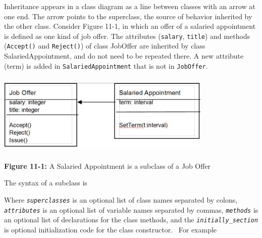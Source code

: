 Inheritance appears in a class diagram as a line between classes with an
arrow at one end. The arrow points to the superclass, the source of
behavior inherited by the other class. Consider Figure 11-1, in which
an offer of a salaried appointment is defined as one kind of job offer.
The attributes (\texttt{salary}, \texttt{title}) and methods
(\texttt{Accept()} and \texttt{Reject()}) of class JobOffer are
inherited by class SalariedAppointment, and do not need to be repeated
there. A new attribute (term) is added in \texttt{SalariedAppointment}
that is not in \texttt{JobOffer}.

\begin{center}
\includegraphics[width=4.05in,height=1.52in]{ub-img/subclass.png} 

{\sffamily\bfseries Figure 11-1:}
{\sffamily A Salaried Appointment is a subclass of a Job Offer}
\end{center}

\noindent
The syntax of a subclass is 


Where \texttt{\textit{superclasses}} is an optional list of class names
separated by colons, \texttt{\textit{attributes}} is an optional list
of variable names separated by commas,
\texttt{\textit{methods}} is an optional list of declarations for the
class methods, and the \texttt{\textit{initially\_section}} is optional
initialization code for the class constructor. \ For
example


